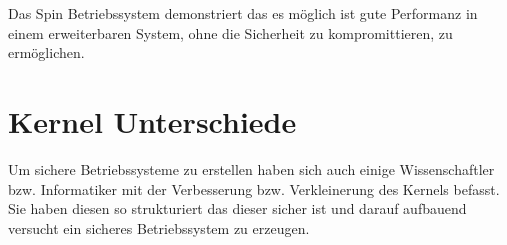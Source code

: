\documentclass[9pt,technote]{IEEEtran}
\begin{document}
      Das Spin Betriebssystem demonstriert das es m\"oglich ist gute Performanz in einem erweiterbaren System, ohne die Sicherheit zu kompromittieren, zu erm\"oglichen.
      
   
  \section{Kernel Unterschiede} \label{sec:kernel}
    Um sichere Betriebssysteme zu erstellen haben sich auch einige Wissenschaftler bzw. Informatiker mit der Verbesserung bzw. Verkleinerung
    des Kernels befasst. Sie haben diesen so strukturiert das dieser sicher ist und darauf aufbauend versucht ein sicheres Betriebssystem zu erzeugen.

   \nocite{*}     


\end{document}
